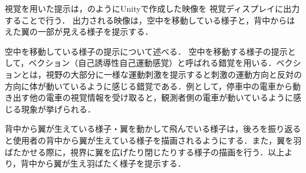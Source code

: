         視覚を用いた提示は，のようにUnityで作成した映像を
        視覚ディスプレイに出力することで行う．
        出力される映像は，空中を移動している様子と，背中からはえた翼の一部が見える様子を提示する．

        空中を移動している様子の提示について述べる．
        空中を移動する様子の提示として，ベクション（自己誘導性自己運動感覚）と呼ばれる錯覚を用いる．ベクションとは，視野の大部分に一様な運動刺激を提示すると刺激の運動方向と反対の方向に体が動いているように感じる錯覚である\cite{妹尾武治2014ベクションとその周辺の近年の動向}．例として，停車中の電車から動き出す他の電車の視覚情報を受け取ると，観測者側の電車が動いているように感じる現象が挙げられる．

        背中から翼が生えている様子・翼を動かして飛んでいる様子は，後ろを振り返ると使用者の背中から翼が生えている様子を描画されるようにする．また，翼を羽ばたかせる際に，視界に翼を広げたり閉じたりする様子の描画を行う．以上より，背中から翼が生え羽ばたく様子を提示する．



